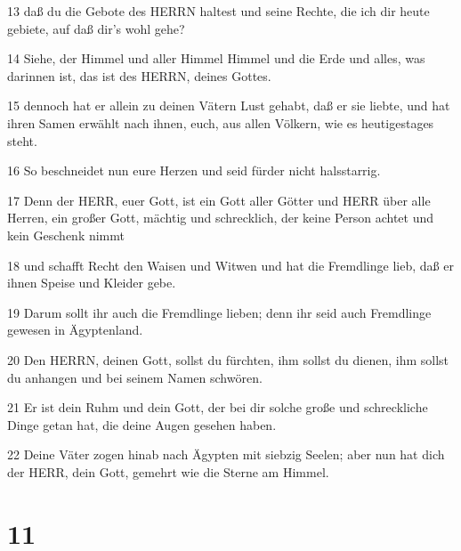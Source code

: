 \par 13 daß du die Gebote des HERRN haltest und seine Rechte, die ich dir heute gebiete, auf daß dir's wohl gehe?
\par 14 Siehe, der Himmel und aller Himmel Himmel und die Erde und alles, was darinnen ist, das ist des HERRN, deines Gottes.
\par 15 dennoch hat er allein zu deinen Vätern Lust gehabt, daß er sie liebte, und hat ihren Samen erwählt nach ihnen, euch, aus allen Völkern, wie es heutigestages steht.
\par 16 So beschneidet nun eure Herzen und seid fürder nicht halsstarrig.
\par 17 Denn der HERR, euer Gott, ist ein Gott aller Götter und HERR über alle Herren, ein großer Gott, mächtig und schrecklich, der keine Person achtet und kein Geschenk nimmt
\par 18 und schafft Recht den Waisen und Witwen und hat die Fremdlinge lieb, daß er ihnen Speise und Kleider gebe.
\par 19 Darum sollt ihr auch die Fremdlinge lieben; denn ihr seid auch Fremdlinge gewesen in Ägyptenland.
\par 20 Den HERRN, deinen Gott, sollst du fürchten, ihm sollst du dienen, ihm sollst du anhangen und bei seinem Namen schwören.
\par 21 Er ist dein Ruhm und dein Gott, der bei dir solche große und schreckliche Dinge getan hat, die deine Augen gesehen haben.
\par 22 Deine Väter zogen hinab nach Ägypten mit siebzig Seelen; aber nun hat dich der HERR, dein Gott, gemehrt wie die Sterne am Himmel.

\chapter{11}

